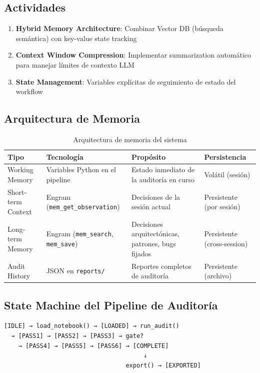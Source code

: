 \documentclass[12pt,a4paper]{article}
\begin{document}
\subsection*{Actividades}
\begin{enumerate}
  \item \textbf{Hybrid Memory Architecture}: Combinar Vector DB (búsqueda semántica) con key-value state tracking
  \item \textbf{Context Window Compression}: Implementar summarization automático para manejar límites de contexto LLM
  \item \textbf{State Management}: Variables explícitas de seguimiento de estado del workflow
\end{enumerate}

\subsection*{Arquitectura de Memoria}
\begin{table}[h]
\centering
\begin{tabular}{llll}
\toprule
\textbf{Tipo} & \textbf{Tecnología} & \textbf{Propósito} & \textbf{Persistencia} \\
\midrule
Working Memory    & Variables Python en el pipeline & Estado inmediato de la auditoría en curso & Volátil (sesión) \\
Short-term Context & Engram (\texttt{mem\_get\_observation}) & Decisiones de la sesión actual & Persistente (por sesión) \\
Long-term Memory  & Engram (\texttt{mem\_search}, \texttt{mem\_save}) & Decisiones arquitectónicas, patrones, bugs fijados & Persistente (cross-session) \\
Audit History     & JSON en \texttt{reports/} & Reportes completos de auditoría & Persistente (archivo) \\
\bottomrule
\end{tabular}
\caption{Arquitectura de memoria del sistema}
\end{table}

\subsection*{State Machine del Pipeline de Auditoría}
\begin{verbatim}
[IDLE] → load_notebook() → [LOADED] → run_audit()
  → [PASS1] → [PASS2] → [PASS3] → gate?
    → [PASS4] → [PASS5] → [PASS6] → [COMPLETE]
                                       ↓
                                  export() → [EXPORTED]
\end{verbatim}
\end{document}
